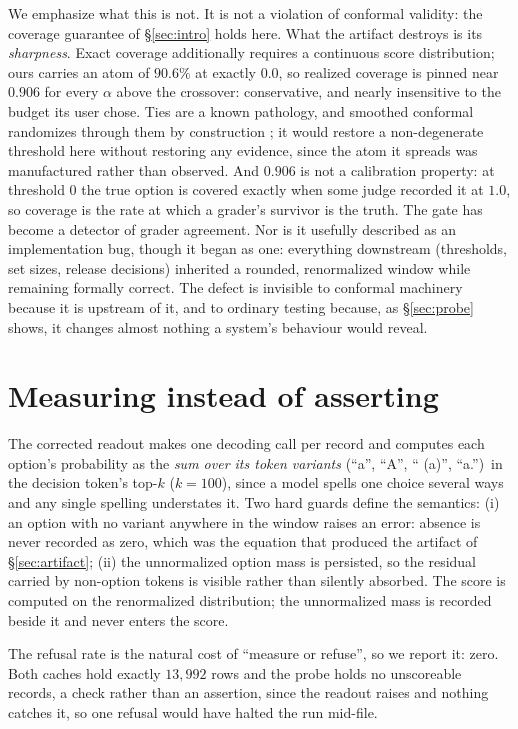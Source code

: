 \documentclass{article}
\newif\ifclaimtags\claimtagsfalse
\newcommand{\ct}[1]{\ifclaimtags\hfill{\scriptsize\textcolor{gray}{[#1]}}\fi}
\begin{document}
We emphasize what this is not. It is not a violation of conformal validity: the coverage guarantee of \S\ref{sec:intro} holds here. What the artifact destroys is
its \emph{sharpness}. Exact coverage additionally requires a
continuous score distribution; ours carries an atom of $90.6\%$ at exactly
$0.0$, so realized coverage is pinned near $0.906$ for every $\alpha$ above the
crossover: conservative, and nearly insensitive to the budget its user chose.
Ties are a known pathology, and smoothed conformal randomizes through them by
construction \citep{vovk2005algorithmic}; it would restore a non-degenerate
threshold here without restoring any evidence, since the atom it spreads was
manufactured rather than observed.
And $0.906$ is not a calibration property: at threshold $0$ the true option
is covered exactly when some judge recorded it at $1.0$, so coverage is the rate
at which a grader's survivor is the truth. The gate has become a detector of
grader agreement.\ct{C4} Nor is it usefully described as an implementation bug, though it began as
one: everything downstream (thresholds, set sizes, release decisions) inherited a rounded, renormalized window while remaining formally correct. The defect is
invisible to conformal machinery because it is upstream of it, and to
ordinary testing because, as \S\ref{sec:probe} shows, it changes almost nothing
a system's behaviour would reveal.

\section{Measuring instead of asserting}\label{sec:fix}
The corrected readout makes one decoding call per record and
computes each option's probability as the \emph{sum over its token variants}
(``a'', ``A'', `` (a)'', ``a.'')\ in the decision token's top-$k$ ($k{=}100$),
since a model spells one choice several ways and any single spelling
understates it. Two hard guards define the semantics: (i) an option with no
variant anywhere in the window raises an error: absence is never recorded as zero, which was the equation that produced the artifact of
\S\ref{sec:artifact}; (ii) the
unnormalized option mass is persisted, so the residual carried by non-option
tokens is visible rather than silently absorbed. The score is computed on the
renormalized distribution; the unnormalized mass is recorded beside it and never
enters the score.\ct{C6, C40}

The refusal rate is the natural cost of ``measure or refuse'', so we report it:
zero. Both caches hold exactly $13{,}992$ rows and the probe holds no unscoreable records, a check rather than an assertion, since the readout raises and nothing catches it, so one refusal would have
halted the run mid-file.\ct{C37}
\end{document}
